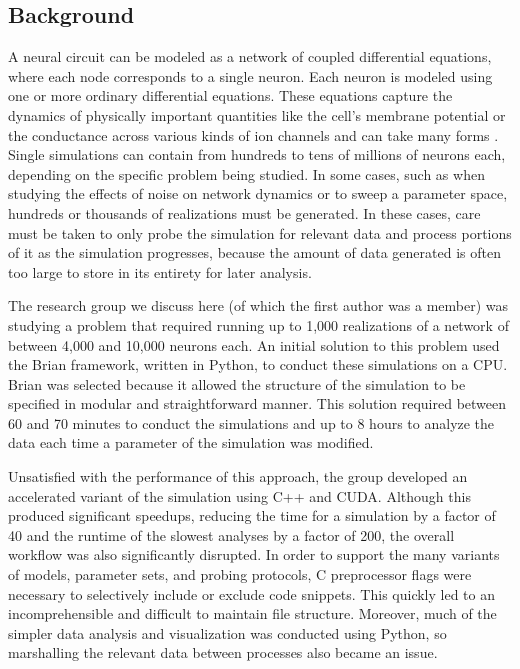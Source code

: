 \documentclass{sig-alternate}
\begin{document}
\subsection{Background}
A neural circuit can be modeled as a network of coupled differential equations, where each node corresponds to a single neuron. Each neuron is modeled using one or more ordinary differential equations. These equations capture the dynamics of physically important quantities like the cell's membrane potential or the conductance across various kinds of ion channels and can take many forms \cite{neurobook}. Single simulations can contain from hundreds to tens of millions of neurons each, depending on the specific problem being studied. In some cases, such as when studying the effects of noise on network dynamics or to sweep a parameter space, hundreds or thousands of realizations must be generated. In these cases, care must be taken to only probe the simulation for relevant data and process portions of it as the simulation progresses, because the amount of data generated is often too large to store in its entirety for later analysis.

The research group we discuss here (of which the first author was a member) was studying a problem that required running up to 1,000 realizations of a network of between 4,000 and 10,000 neurons each. An initial solution to this problem used the Brian framework, written in Python, to conduct these simulations on a CPU. Brian was selected because it allowed the structure of the  simulation to be specified in modular and straightforward manner. This solution required between 60 and 70 minutes to conduct the simulations and up to 8 hours to analyze the data each time a parameter of the simulation was modified.

Unsatisfied with the performance of this approach, the group developed an accelerated variant of the simulation using C++ and CUDA. Although this produced significant speedups, reducing the time for a simulation by a factor of 40 and the runtime of the slowest analyses by a factor of 200, the overall workflow was also significantly disrupted. In order to support the many variants of models, parameter sets, and probing protocols, C preprocessor flags were necessary to selectively include or exclude code snippets. This quickly led to an incomprehensible and difficult to maintain file structure. Moreover, much of the simpler data analysis and visualization was conducted using Python, so marshalling the relevant data between processes also became an issue. 
\end{document}
